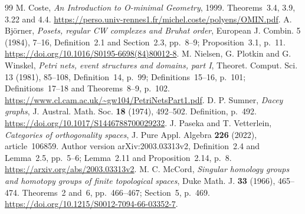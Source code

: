\documentclass[11pt,a4paper]{article}
\theoremstyle{definition}
\begin{document}
\begin{thebibliography}{99}
 M. Coste, \emph{An Introduction to O-minimal Geometry}, 1999. Theorems~3.4, 3.9, 3.22 and 4.4. \url{https://perso.univ-rennes1.fr/michel.coste/polyens/OMIN.pdf}.
 A. Bj\"orner, \emph{Posets, regular CW complexes and Bruhat order}, European J. Combin. 5 (1984), 7--16, Definition~2.1 and Section~2.3, pp.~8--9; Proposition~3.1, p.~11. \url{https://doi.org/10.1016/S0195-6698(84)80012-8}.
 M. Nielsen, G. Plotkin and G. Winskel, \emph{Petri nets, event structures and domains, part I}, Theoret. Comput. Sci. 13 (1981), 85--108, Definition~14, p.~99; Definitions~15--16, p.~101; Definitions~17--18 and Theorems~8--9, p.~102. \url{https://www.cl.cam.ac.uk/~gw104/PetriNetsPart1.pdf}.
 D. P. Sumner, \emph{Dacey graphs}, J. Austral. Math. Soc. \textbf{18} (1974), 492--502. Definition, p.~492. \url{https://doi.org/10.1017/S1446788700029232}.
 J. Paseka and T. Vetterlein, \emph{Categories of orthogonality spaces}, J. Pure Appl. Algebra \textbf{226} (2022), article~106859. Author version arXiv:2003.03313v2, Definition~2.4 and Lemma~2.5, pp.~5--6; Lemma~2.11 and Proposition~2.14, p.~8. \url{https://arxiv.org/abs/2003.03313v2}.
 M. C. McCord, \emph{Singular homology groups and homotopy groups of finite topological spaces}, Duke Math. J. \textbf{33} (1966), 465--474. Theorems~2 and~6, pp.~466--467; Section~5, p.~469. \url{https://doi.org/10.1215/S0012-7094-66-03352-7}.
\end{thebibliography}
\endgroup
\end{document}
